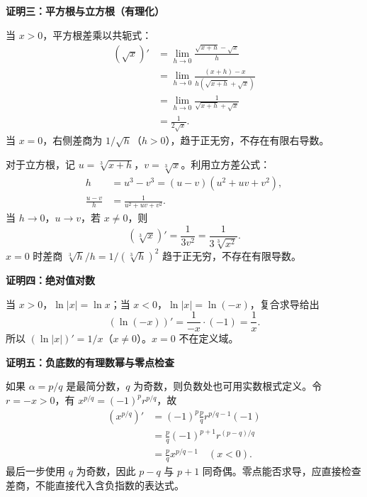 \begin{proofbox}
\medskip
\begin{minipage}{\linewidth}
\textbf{\textcolor{CProof}{证明三：平方根与立方根（有理化）}}


\end{minipage}



当 $x>0$，平方根差乘以共轭式：
\[
\begin{aligned}
(\sqrt{x})'&=\lim_{h\to0}\frac{\sqrt{x+h}-\sqrt{x}}h\\
&=\lim_{h\to0}\frac{(x+h)-x}{h(\sqrt{x+h}+\sqrt{x})}\\
&=\lim_{h\to0}\frac1{\sqrt{x+h}+\sqrt{x}}\\
&=\frac1{2\sqrt{x}}.
\end{aligned}
\]
当 $x=0$，右侧差商为 $1/\sqrt h$（$h>0$），趋于正无穷，不存在有限右导数。

对于立方根，记 $u=\sqrt[3]{x+h}$，$v=\sqrt[3]x$。利用立方差公式：
\[
\begin{aligned}
h&=u^3-v^3=(u-v)(u^2+uv+v^2),\\
\frac{u-v}{h}&=\frac1{u^2+uv+v^2}.
\end{aligned}
\]
当 $h\to0$，$u\to v$，若 $x\ne0$，则
\[
(\sqrt[3]x)'=\frac1{3v^2}=\frac1{3\sqrt[3]{x^2}}.
\]
$x=0$ 时差商 $\sqrt[3]h/h=1/(\sqrt[3]h)^2$ 趋于正无穷，不存在有限导数。

\medskip


\begin{minipage}{\linewidth}
\textbf{\textcolor{CProof}{证明四：绝对值对数}}


\end{minipage}

当 $x>0$，$\ln|x|=\ln x$；当 $x<0$，$\ln|x|=\ln(-x)$，复合求导给出
\[
(\ln(-x))'=\frac1{-x}\cdot(-1)=\frac1x.
\]
所以 $(\ln|x|)'=1/x$（$x\ne0$）。$x=0$ 不在定义域。

\medskip
\begin{minipage}{\linewidth}
\textbf{\textcolor{CProof}{证明五：负底数的有理数幂与零点检查}}


\end{minipage}

如果 $\alpha=p/q$ 是最简分数，$q$ 为奇数，则负数处也可用实数根式定义。令 $r=-x>0$，有 $x^{p/q}=(-1)^p r^{p/q}$，故
\[
\begin{aligned}
(x^{p/q})'&=(-1)^p\frac pq r^{p/q-1}(-1)\\
&=\frac pq(-1)^{p+1}r^{(p-q)/q}\\
&=\frac pq x^{p/q-1}\quad(x<0).
\end{aligned}
\]
最后一步使用 $q$ 为奇数，因此 $p-q$ 与 $p+1$ 同奇偶。零点能否求导，应直接检查差商，不能直接代入含负指数的表达式。


\end{proofbox}
